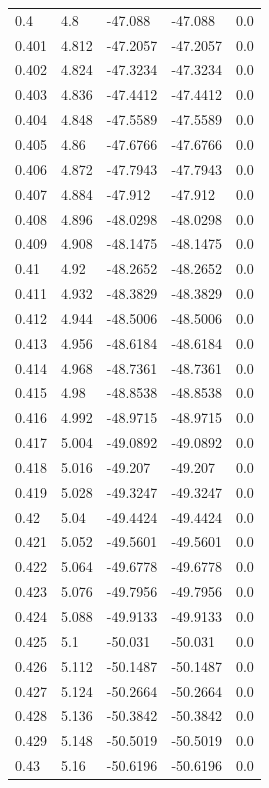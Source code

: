 \begin{table}[H]
\begin{tabular}{lllll}
0.4 & 4.8 & -47.088 & -47.088 & 0.0 \\
0.401 & 4.812 & -47.2057 & -47.2057 & 0.0 \\
0.402 & 4.824 & -47.3234 & -47.3234 & 0.0 \\
0.403 & 4.836 & -47.4412 & -47.4412 & 0.0 \\
0.404 & 4.848 & -47.5589 & -47.5589 & 0.0 \\
0.405 & 4.86 & -47.6766 & -47.6766 & 0.0 \\
0.406 & 4.872 & -47.7943 & -47.7943 & 0.0 \\
0.407 & 4.884 & -47.912 & -47.912 & 0.0 \\
0.408 & 4.896 & -48.0298 & -48.0298 & 0.0 \\
0.409 & 4.908 & -48.1475 & -48.1475 & 0.0 \\
0.41 & 4.92 & -48.2652 & -48.2652 & 0.0 \\
0.411 & 4.932 & -48.3829 & -48.3829 & 0.0 \\
0.412 & 4.944 & -48.5006 & -48.5006 & 0.0 \\
0.413 & 4.956 & -48.6184 & -48.6184 & 0.0 \\
0.414 & 4.968 & -48.7361 & -48.7361 & 0.0 \\
0.415 & 4.98 & -48.8538 & -48.8538 & 0.0 \\
0.416 & 4.992 & -48.9715 & -48.9715 & 0.0 \\
0.417 & 5.004 & -49.0892 & -49.0892 & 0.0 \\
0.418 & 5.016 & -49.207 & -49.207 & 0.0 \\
0.419 & 5.028 & -49.3247 & -49.3247 & 0.0 \\
0.42 & 5.04 & -49.4424 & -49.4424 & 0.0 \\
0.421 & 5.052 & -49.5601 & -49.5601 & 0.0 \\
0.422 & 5.064 & -49.6778 & -49.6778 & 0.0 \\
0.423 & 5.076 & -49.7956 & -49.7956 & 0.0 \\
0.424 & 5.088 & -49.9133 & -49.9133 & 0.0 \\
0.425 & 5.1 & -50.031 & -50.031 & 0.0 \\
0.426 & 5.112 & -50.1487 & -50.1487 & 0.0 \\
0.427 & 5.124 & -50.2664 & -50.2664 & 0.0 \\
0.428 & 5.136 & -50.3842 & -50.3842 & 0.0 \\
0.429 & 5.148 & -50.5019 & -50.5019 & 0.0 \\
0.43 & 5.16 & -50.6196 & -50.6196 & 0.0 \\

\end{tabular}
\end{table}
